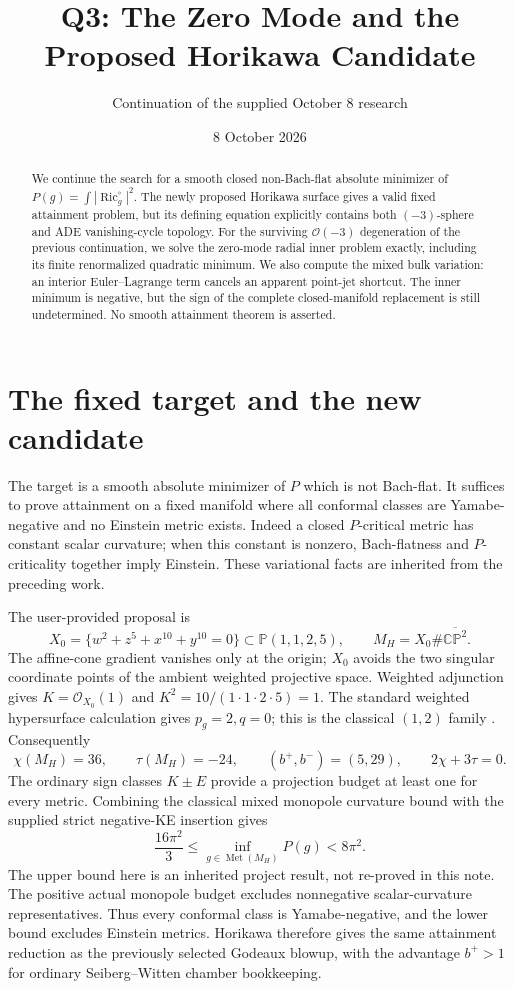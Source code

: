 \documentclass[11pt]{article}
\title{Q3: The Zero Mode and the Proposed Horikawa Candidate}
\author{Continuation of the supplied October 8 research}
\date{8 October 2026}
\newcommand{\Ric}{\operatorname{Ric}}
\newcommand{\CP}{\mathbb{CP}}
\begin{document}
\maketitle
\begin{abstract}
We continue the search for a smooth closed non-Bach-flat absolute minimizer
of $P(g)=\int|\Ric_g^\circ|^2$. The newly proposed Horikawa surface gives
a valid fixed attainment problem, but its defining equation explicitly
contains both $(-3)$-sphere and ADE vanishing-cycle topology. For the
surviving $\mathcal O(-3)$ degeneration of the previous continuation,
we solve the zero-mode radial inner problem exactly, including its finite
renormalized quadratic minimum. We also compute the mixed bulk variation:
an interior Euler--Lagrange term cancels an apparent point-jet shortcut.
The inner minimum is negative, but the sign of the complete closed-manifold
replacement is still undetermined. No smooth attainment theorem is asserted.
\end{abstract}

\section{The fixed target and the new candidate}
The target is a smooth absolute minimizer of $P$ which is not Bach-flat.
It suffices to prove attainment on a fixed manifold where all conformal
classes are Yamabe-negative and no Einstein metric exists. Indeed a closed
$P$-critical metric has constant scalar curvature; when this constant is
nonzero, Bach-flatness and $P$-criticality together imply Einstein.
These variational facts are inherited from the preceding work.

The user-provided proposal is
\[
 X_0=\{w^2+z^5+x^{10}+y^{10}=0\}\subset\mathbb P(1,1,2,5),
 \qquad M_H=X_0\#\overline{\CP^2}.
\]
The affine-cone gradient vanishes only at the origin; $X_0$ avoids the
two singular coordinate points of the ambient weighted projective space.
Weighted adjunction gives $K=\mathcal O_{X_0}(1)$ and
$K^2=10/(1\cdot1\cdot2\cdot5)=1$. The standard weighted hypersurface
calculation gives $p_g=2,q=0$; this is the classical $(1,2)$ family
\cite{CP}. Consequently
\[
 \chi(M_H)=36,\qquad \tau(M_H)=-24,\qquad
 (b^+,b^-)=(5,29),\qquad 2\chi+3\tau=0.
\]
The ordinary sign classes $K\pm E$ provide a projection budget at least
one for every metric. Combining the classical mixed monopole curvature
bound \cite{LeBrun} with the supplied strict negative-KE insertion gives
\begin{equation}
 \frac{16\pi^2}{3}\le\inf_{g\in\operatorname{Met}(M_H)}P(g)<8\pi^2.
 \label{eq:interval}
\end{equation}
The upper bound here is an inherited project result, not re-proved in
this note. The positive actual monopole budget excludes nonnegative
scalar-curvature representatives. Thus every conformal class is
Yamabe-negative, and the lower bound excludes Einstein metrics.
Horikawa therefore gives the same attainment reduction as the previously
selected Godeaux blowup, with the advantage $b^+>1$ for ordinary
Seiberg--Witten chamber bookkeeping.
\end{document}
